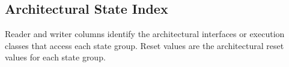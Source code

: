 \subsection{Architectural State Index}

Reader and writer columns identify the architectural interfaces or execution classes that access each state group.
Reset values are the architectural reset values for each state group.



\Needspace{2.2in}
